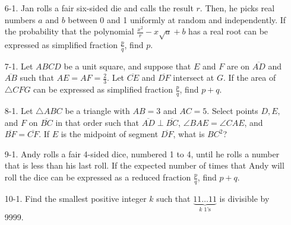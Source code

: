 \documentclass[10pt]{article}
\begin{document}
\begin{enumerate}

\item[6-1.] Jan rolls a fair six-sided die and calls the result $r$. Then, he picks real numbers $a$ and $b$ between 0 and 1 uniformly at random and independently. If the probability that the polynomial $\tfrac{x^2}{r} - x\sqrt{a} + b$ has a real root can be expressed as simplified fraction $\frac{p}{q}$, find $p$.

\item[7-1.] Let $ABCD$ be a unit square, and suppose that $E$ and $F$ are on $\overline{AD}$ and $\overline{AB}$ such that $AE = AF = \tfrac23$. Let $\overline{CE}$ and $\overline{DF}$ intersect at $G$. If the area of $\triangle CFG$ can be expressed as simplified fraction $\frac{p}{q}$, find $p + q$.

\item[8-1.] Let $\triangle ABC$ be a triangle with $AB=3$ and $AC=5$. Select points $D, E,$ and $F$ on $\overline{BC}$ in that order such that $\overline{AD}\perp \overline{BC}$, $\angle BAE=\angle CAE$, and $\overline{BF}=\overline{CF}$. If $E$ is the midpoint of segment $\overline{DF}$, what is $BC^2$?

\item[9-1.] Andy rolls a fair 4-sided dice, numbered 1 to 4, until he rolls a number that is less than his last roll. If the expected number of times that Andy will roll the dice can be expressed as a reduced fraction $\frac{p}{q}$, find $p + q$.

\item[10-1.] Find the smallest positive integer $k$ such that $\underbrace{11\dots11}_{\text{$k$ 1's}}$ is divisible by 9999.

\end{enumerate}
\end{document}
